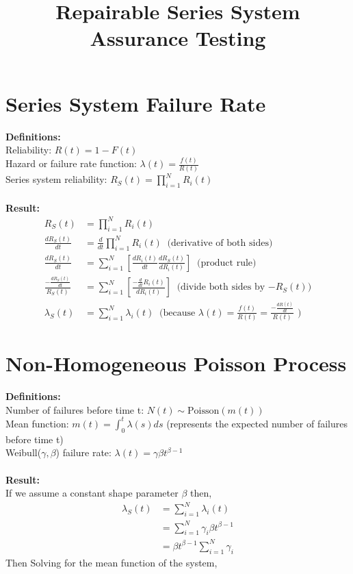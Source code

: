 \documentclass{article}
\begin{document}
\title{Repairable Series System Assurance Testing}

\section{Series System Failure Rate}

\textbf{Definitions:} \\
\noindent
Reliability: $R(t) = 1 - F(t)$ \\
Hazard or failure rate function: $\lambda(t) = \frac{f(t)}{R(t)}$ \\
Series system reliability: $R_S(t) = \prod_{i = 1}^N R_i(t)$
\\
\\
\textbf{Result:}
$$
\begin{aligned}
	R_S(t) &= \prod_{i = 1}^N R_i(t) \\
	\frac{dR_S(t)}{dt} &= \frac{d}{dt} \prod_{i = 1}^N R_i(t) \; \; \text{(derivative of both sides)} \\
	\frac{dR_S(t)}{dt} &= \sum_{i=1}^N \left[ \frac{dR_i(t)}{dt} \frac{dR_S(t)}{dR_i(t)} \right] \; \; \text{(product rule)} \\
    \frac{-\frac{dR_S(t)}{dt}}{R_S(t)} &= \sum_{i=1}^N \left[  \frac{-\frac{d}{dt}R_i(t)}{dR_i(t)} \right] \; \; \text{(divide both sides by $-R_S(t)$)} \\
    \lambda_S(t) &= \sum_{i = 1}^N \lambda_i(t) \; \; \text{(because $\lambda(t) = \frac{f(t)}{R(t)} = \frac{-\frac{dR(t)}{dt}}{R(t)}$ )}
\end{aligned}
$$

\section{Non-Homogeneous Poisson Process}

\textbf{Definitions:} \\
\noindent
Number of failures before time t: $N(t) \sim \text{Poisson}(m(t))$ \\
Mean function: $m(t) = \int_0^t \lambda(s)ds$ (represents the expected number of failures before time t) \\
Weibull($\gamma, \beta $) failure rate: $\lambda(t) = \gamma\beta t^{\beta - 1}$
\\
\\
\textbf{Result:}\\
If we assume a constant shape parameter $\beta$ then,\\
$$
\begin{aligned}
	\lambda_S(t) &= \sum_{i = 1}^N \lambda_i(t) \\
    &= \sum_{i = 1}^N \gamma_i\beta t^{\beta - 1} \\
    &= \beta t^{\beta -1} \sum_{i = 1}^N \gamma_i
\end{aligned}
$$
\newpage
Then Solving for the mean function of the system,
\end{document}
